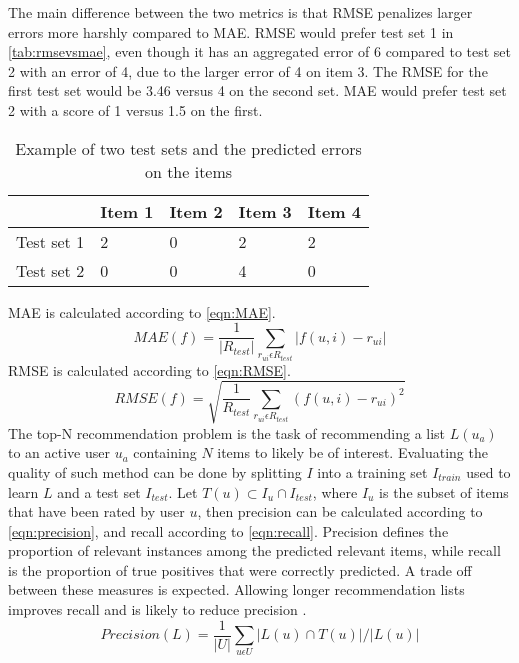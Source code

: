 The main difference between the two metrics is that RMSE penalizes larger errors more harshly compared to MAE.
RMSE would prefer test set 1 in \autoref{tab:rmsevsmae}, even though it has an aggregated error of 6 compared to test set 2 with an error of 4, due to the larger error of 4 on item 3.
The RMSE for the first test set would be 3.46 versus 4 on the second set.
MAE would prefer test set 2 with a score of 1 versus 1.5 on the first.
\begin{table}[]
    \begin{tabular}{|l|l|l|l|l|}
    \hline
               & Item 1 & Item 2 & Item 3 & Item 4 \\ \hline
    Test set 1 & 2      & 0      & 2      & 2      \\ \hline
    Test set 2 & 0      & 0      & 4      & 0      \\ \hline
    \end{tabular}
    \caption{Example of two test sets and the predicted errors on the items}
    \label{tab:rmsevsmae}
\end{table}
MAE is calculated according to \autoref{eqn:MAE}.
\begin{equation}
    \label{eqn:MAE}
    MAE(f) = \frac{1}{|R_{test}|} \sum\limits_{r_{ui} \epsilon R_{test}} |f(u,i)-r_{ui}|
\end{equation}
RMSE is calculated according to \autoref{eqn:RMSE}.
\begin{equation}
    \label{eqn:RMSE}
    RMSE(f) = \sqrt{\frac{1}{R_{test}} \sum\limits_{r_{ui} \epsilon R_{test}} (f(u, i) - r_{ui})^2}
\end{equation}
The top-N recommendation problem is the task of recommending a list $L(u_a)$ to an active user $u_a$ containing $N$ items to likely be of interest.
Evaluating the quality of such method can be done by splitting $I$ into a training set $I_{train}$ used to learn $L$ and a test set $I_{test}$.
Let $T(u) \subset I_u \cap I_{test}$, where $I_u$ is the subset of items that have been rated by user $u$, then precision can be calculated according to \autoref{eqn:precision}, and recall according to \autoref{eqn:recall}.
Precision defines the proportion of relevant instances among the predicted relevant items, while recall is the proportion of true positives that were correctly predicted.
A trade off between these measures is expected.
Allowing longer recommendation lists improves recall and is likely to reduce precision \cite{RecommenderHandbook2015}.
\begin{equation}
    \label{eqn:precision}
    Precision(L) = \frac{1}{|U|} \sum\limits_{u \epsilon U} |L(u) \cap T(u)| / |L(u)|
\end{equation}

